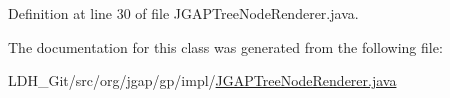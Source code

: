Definition at line 30 of file J\-G\-A\-P\-Tree\-Node\-Renderer.\-java.



The documentation for this class was generated from the following file\-:\begin{DoxyCompactItemize}
\item 
L\-D\-H\-\_\-\-Git/src/org/jgap/gp/impl/\hyperlink{_j_g_a_p_tree_node_renderer_8java}{J\-G\-A\-P\-Tree\-Node\-Renderer.\-java}\end{DoxyCompactItemize}
